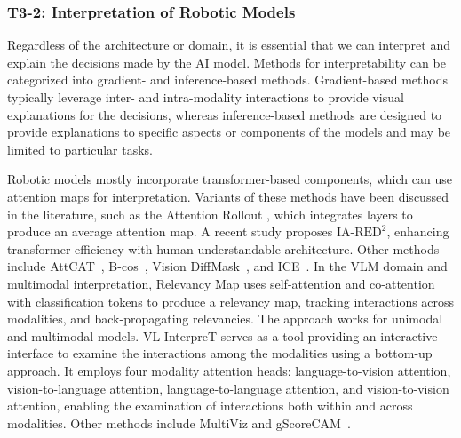 \subsubsection{T3-2: Interpretation of Robotic Models} \label{sec:t3_2}

Regardless of the architecture or domain, it is essential that we can interpret and explain the decisions made by the AI model.
Methods for interpretability can be categorized into gradient- and inference-based methods. 
Gradient-based methods typically leverage inter- and intra-modality interactions to provide visual explanations for the decisions, whereas inference-based methods are designed to provide explanations to specific aspects or components of the models and may be limited to particular tasks.




Robotic models mostly incorporate transformer-based components, which can use
attention maps for interpretation. 
Variants of these methods have been discussed in the literature, such as the Attention Rollout \cite{abnar2020quantifying}, which integrates layers to produce an average attention map. %
A recent study \cite{DBLP:journals/corr/abs-2106-12620} proposes $\text{IA-RED}^2$, enhancing transformer efficiency with human-understandable architecture.
Other methods include AttCAT~\cite{DBLP:conf/nips/QiangPLLJZ22}, B-cos~\cite{DBLP:journals/corr/abs-2301-08669}, Vision DiffMask~\cite{DBLP:conf/cvpr/NalmpantisPGPA23}, and ICE~\cite{DBLP:conf/cvpr/ChoiJH23}.
In the VLM domain and multimodal interpretation, Relevancy Map \cite{chefer2021generic} uses self-attention and co-attention with classification tokens to produce a relevancy map, tracking interactions across modalities, and back-propagating relevancies. The approach works for unimodal and multimodal models.
VL-InterpreT \cite{aflalo2022vl} serves as a tool providing an interactive interface to examine the interactions among the modalities using a bottom-up approach. It employs four modality attention heads: language-to-vision attention, vision-to-language attention, language-to-language attention, and vision-to-vision attention, enabling the examination of interactions both within and across modalities.
Other methods include MultiViz \cite{liang2022multiviz} and gScoreCAM~\cite{chen2022gscorecam}.
 



